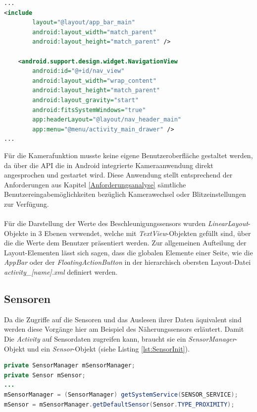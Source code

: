 \begin{lstlisting}[caption=Layout des Hauptmenüs in der Datei \textit{activity\_main.xml}, label=lst:MainMenu, language=XML]
...
<include
        layout="@layout/app_bar_main"
        android:layout_width="match_parent"
        android:layout_height="match_parent" />

    <android.support.design.widget.NavigationView
        android:id="@+id/nav_view"
        android:layout_width="wrap_content"
        android:layout_height="match_parent"
        android:layout_gravity="start"
        android:fitsSystemWindows="true"
        app:headerLayout="@layout/nav_header_main"
        app:menu="@menu/activity_main_drawer" />
...
\end{lstlisting} 

Für die Kamerafunktion musste keine eigene Benutzeroberfläche gestaltet werden, da über die API die in Android integrierte Kameraanwendung direkt angesprochen und gestartet wird. Diese Anwendung stellt entsprechend der Anforderungen aus Kapitel \ref{Anforderungsanalyse} sämtliche Benutzereingabemöglichkeiten bezüglich Kamerawechsel oder Blitzeinstellungen zur Verfügung. 
\\
\\
Für die Darstellung der Werte des Beschleunigungssensors wurden \textit{LinearLayout}-Objekte in 3 Ebenen verwendet, welche mit \textit{TextView}-Objekten gefüllt sind, über die die Werte dem Benutzer präsentiert werden. Zur allgemeinen Aufteilung der Layout-Elementen lässt sich sagen, dass die globalen Elemente einer Seite, wie die \textit{AppBar} oder der \textit{FloatingActionButton} in der hierarchisch obersten Layout-Datei \textit{activity\_[name].xml} definiert werden.

\subsection*{Sensoren} \label{ImplNativSensors}

Da die Zugriffe auf die Sensoren und das Auslesen ihrer Daten äquivalent sind werden diese Vorgänge hier am Beispiel des Näherungssensors erläutert. Damit Die \textit{Activity} auf Sensordaten zugreifen kann, braucht sie ein \textit{SensorManager}-Objekt und ein \textit{Sensor}-Objekt (siehe Listing \ref{lst:SensorInit}).

\begin{lstlisting}[caption=Definition und Initialisierung von Sensor und SensorManager, label=lst:SensorInit, language=Java]
private SensorManager mSensorManager;
private Sensor mSensor;
...
mSensorManager = (SensorManager) getSystemService(SENSOR_SERVICE);
mSensor = mSensorManager.getDefaultSensor(Sensor.TYPE_PROXIMITY);
\end{lstlisting} 

